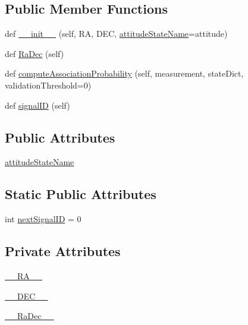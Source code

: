 \subsection*{Public Member Functions}
\begin{DoxyCompactItemize}
\item 
def \hyperlink{classSignals_1_1PointSource_a08c5c8fe52979814a725fac08b34c02f}{\+\_\+\+\_\+init\+\_\+\+\_\+} (self, RA, D\+EC, \hyperlink{classSignals_1_1PointSource_a151f2600c3623d1ca49fb51feb8a1178}{attitude\+State\+Name}=\textquotesingle{}attitude\textquotesingle{})
\item 
def \hyperlink{classSignals_1_1PointSource_a5fbb36eda0901536d77eff9a3262ae9e}{Ra\+Dec} (self)
\item 
def \hyperlink{classSignals_1_1PointSource_ab1389987fc68312eed77ae3126a21a2a}{compute\+Association\+Probability} (self, measurement, state\+Dict, validation\+Threshold=0)
\item 
def \hyperlink{classSignals_1_1SignalSource_a85016cca8a7f1e188d314ced50577d05}{signal\+ID} (self)
\end{DoxyCompactItemize}
\subsection*{Public Attributes}
\begin{DoxyCompactItemize}
\item 
\hyperlink{classSignals_1_1PointSource_a151f2600c3623d1ca49fb51feb8a1178}{attitude\+State\+Name}
\end{DoxyCompactItemize}
\subsection*{Static Public Attributes}
\begin{DoxyCompactItemize}
\item 
int \hyperlink{classSignals_1_1SignalSource_abcff0d069f17cb5ebe3eff15b6283a64}{next\+Signal\+ID} = 0
\end{DoxyCompactItemize}
\subsection*{Private Attributes}
\begin{DoxyCompactItemize}
\item 
\hyperlink{classSignals_1_1PointSource_ab452ac8a968d9ac8759cb95f60424932}{\+\_\+\+\_\+\+R\+A\+\_\+\+\_\+}
\item 
\hyperlink{classSignals_1_1PointSource_a47e98573bcf62bb6e80f1bcbbdb79620}{\+\_\+\+\_\+\+D\+E\+C\+\_\+\+\_\+}
\item 
\hyperlink{classSignals_1_1PointSource_ac876dc0b41dd3da6bb9b8ec9c41e0dd2}{\+\_\+\+\_\+\+Ra\+Dec\+\_\+\+\_\+}
\end{DoxyCompactItemize}


